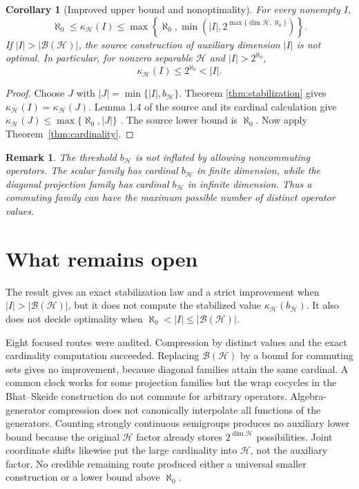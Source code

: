 \documentclass[11pt]{article}
\newtheorem{corollary}[theorem]{Corollary}
\newtheorem{remark}[theorem]{Remark}
\newcommand{\B}{\mathcal B}
\newcommand{\kHI}{\kappa_{\mathcal H}}
\begin{document}
\begin{corollary}[Improved upper bound and nonoptimality]\label{cor:bound}
For every nonempty $I$,
\[
 \aleph_0\leq\kHI(I)\leq
 \max\!\left\{\aleph_0,
 \min\!\left(|I|,2^{\max\{\dim\mathcal H,\aleph_0\}}\right)\right\}.
\]
If $|I|>|\B(\mathcal H)|$, the source construction of auxiliary dimension $|I|$ is
not optimal. In particular, for nonzero separable $\mathcal H$ and
$|I|>2^{\aleph_0}$,
\[
 \kHI(I)\leq2^{\aleph_0}<|I|.
\]
\end{corollary}

\begin{proof}
Choose $J$ with $|J|=\min\{|I|,b_{\mathcal H}\}$. Theorem
\ref{thm:stabilization} gives $\kHI(I)=\kHI(J)$. Lemma 1.4 of the source and its
cardinal calculation give
$\kHI(J)\leq\max\{\aleph_0,|J|\}$ \cite[Lemma~1.4 and Problem~2.8]{Dahya}.
The source lower bound is $\aleph_0$. Now apply Theorem~\ref{thm:cardinality}.
\end{proof}

\begin{remark}
The threshold $b_{\mathcal H}$ is not inflated by allowing noncommuting operators.
The scalar family has cardinal $b_{\mathcal H}$ in finite dimension, while the diagonal
projection family has cardinal $b_{\mathcal H}$ in infinite dimension. Thus a commuting
family can have the maximum possible number of distinct operator values.
\end{remark}

\section{What remains open}

The result gives an exact stabilization law and a strict improvement when
$|I|>|\B(\mathcal H)|$, but it does not compute the stabilized value
$\kHI(b_{\mathcal H})$. It also does not decide optimality when
$\aleph_0<|I|\leq|\B(\mathcal H)|$.

Eight focused routes were audited. Compression by distinct values and the exact
cardinality computation succeeded. Replacing $\B(\mathcal H)$ by a bound for commuting
sets gives no improvement, because diagonal families attain the same cardinal. A common
clock works for some projection families but the wrap cocycles in the Bhat--Skeide
construction do not commute for arbitrary operators. Algebra-generator compression does
not canonically interpolate all functions of the generators. Counting strongly continuous
semigroups produces no auxiliary lower bound because the original $\mathcal H$ factor
already stores $2^{\dim\mathcal H}$ possibilities. Joint coordinate shifts likewise put
the large cardinality into $\mathcal H$, not the auxiliary factor. No credible remaining
route produced either a universal smaller construction or a lower bound above $\aleph_0$.
\end{document}
